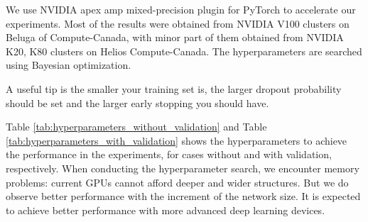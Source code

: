\documentclass{article}
\begin{document}
We use NVIDIA apex amp mixed-precision plugin for PyTorch to accelerate our experiments. Most of the results were obtained from NVIDIA V100 clusters on Beluga of Compute-Canada, with minor part of them obtained from NVIDIA K20, K80 clusters on Helios Compute-Canada. The hyperparameters are searched using Bayesian optimization.

A useful tip is the smaller your training set is, the larger dropout probability should be set and the larger early stopping you should have.

Table \ref{tab:hyperparameters_without_validation} and Table \ref{tab:hyperparameters_with_validation} shows the hyperparameters to achieve the performance in the experiments, for cases without and with validation, respectively. When conducting the hyperparameter search, we encounter memory problems: current GPUs cannot afford deeper and wider structures. But we do observe better performance with the increment of the network size. It is expected to achieve better performance with more advanced deep learning devices.
\end{document}
